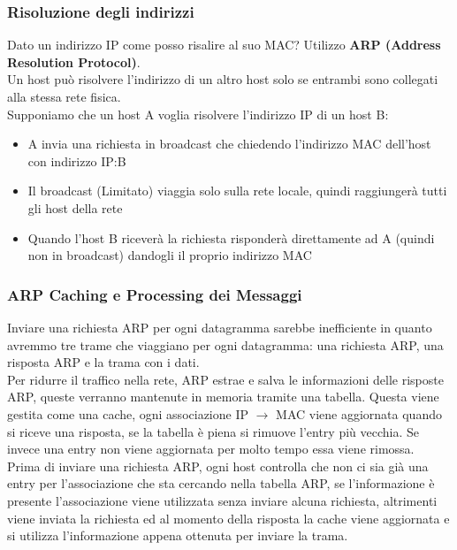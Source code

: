 \documentclass{article}
\begin{document}
            \subsubsection{Risoluzione degli indirizzi}
                Dato un indirizzo IP come posso risalire al suo MAC? Utilizzo \textbf{ARP (Address Resolution Protocol)}. \\
                Un host può risolvere l'indirizzo di un altro host solo se entrambi sono collegati alla stessa rete fisica. \\
                Supponiamo che un host A voglia risolvere l'indirizzo IP di un host B:
                \begin{itemize}
                    \item A invia una richiesta in broadcast che chiedendo l'indirizzo MAC dell'host con indirizzo IP:B
                    \item Il broadcast (Limitato) viaggia solo sulla rete locale, quindi raggiungerà tutti gli host della rete
                    \item Quando l'host B riceverà la richiesta risponderà direttamente ad A (quindi non in broadcast) dandogli il proprio indirizzo MAC
                \end{itemize}

            \subsubsection{ARP Caching e Processing dei Messaggi}
                Inviare una richiesta ARP per ogni datagramma sarebbe inefficiente in quanto avremmo tre trame che viaggiano per ogni datagramma: una richiesta ARP, una risposta ARP e la trama con i dati.\\
                Per ridurre il traffico nella rete, ARP estrae e salva le informazioni delle risposte ARP, queste verranno mantenute in memoria tramite una tabella. Questa viene gestita come una cache, ogni associazione IP $ \rightarrow $ MAC viene aggiornata quando si riceve una risposta, se la tabella è piena si rimuove l'entry più vecchia. Se invece una entry non viene aggiornata per molto tempo essa viene rimossa. \\
                Prima di inviare una richiesta ARP, ogni host controlla che non ci sia già una entry per l'associazione che sta cercando nella tabella ARP, se l'informazione è presente l'associazione viene utilizzata senza inviare alcuna richiesta, altrimenti viene inviata la richiesta ed al momento della risposta la cache viene aggiornata e si utilizza l'informazione appena ottenuta per inviare la trama.
                
\end{document}
